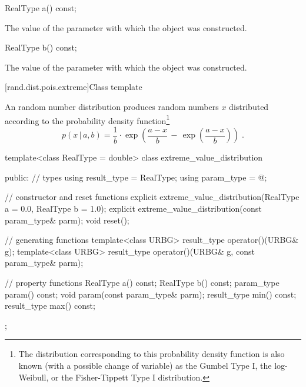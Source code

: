 %
\begin{itemdecl}
RealType a() const;
\end{itemdecl}

\begin{itemdescr}
\pnum\returns The value of the  parameter
 with which the object was constructed.
\end{itemdescr}

%
\begin{itemdecl}
RealType b() const;
\end{itemdecl}

\begin{itemdescr}
\pnum\returns The value of the  parameter
 with which the object was constructed.
\end{itemdescr}


[rand.dist.pois.extreme]{Class template }
%
%

\pnum
An  random number distribution
produces random numbers $x$
distributed according to
the probability density function\footnote{The distribution corresponding to
 this probability density function
 is also known
 (with a possible change of variable)
 as the Gumbel Type I,
 the log-Weibull,
 or the Fisher-Tippett Type I
 distribution.}%
%
\[%
 p(x\,|\,a,b)
      =       \frac{1}{b}
        \cdot \exp\left(  \frac{a-x}{b}
                       \,-\, \exp\left(\frac{a-x}{b}\right)
                  \right)
\; \mbox{.}
\]

%
\begin{codeblock}
template<class RealType = double>
  class extreme_value_distribution {
  public:
    // types
    using result_type = RealType;
    using param_type  = @\unspec@;

    // constructor and reset functions
    explicit extreme_value_distribution(RealType a = 0.0, RealType b = 1.0);
    explicit extreme_value_distribution(const param_type& parm);
    void reset();

    // generating functions
    template<class URBG>
      result_type operator()(URBG& g);
    template<class URBG>
      result_type operator()(URBG& g, const param_type& parm);

    // property functions
    RealType a() const;
    RealType b() const;
    param_type param() const;
    void param(const param_type& parm);
    result_type min() const;
    result_type max() const;
  };
\end{codeblock}



